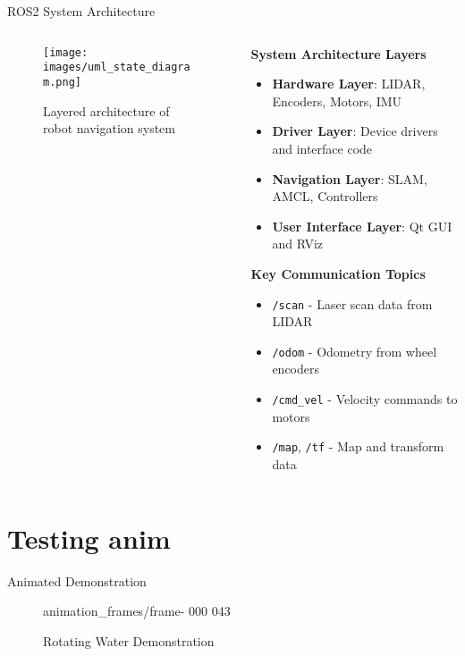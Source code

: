 \documentclass[aspectratio=169]{beamer}
\begin{document}
\begin{frame}{ROS2 System Architecture}
  \begin{columns}
    \begin{column}{0.5\textwidth}
      \begin{figure}
        \centering
        \texttt{[image: images/uml\_state\_diagram.png]} %
        \caption{Layered architecture of robot navigation system}
      \end{figure}
    \end{column}
    \begin{column}{0.5\textwidth}
      \textbf{System Architecture Layers}
      \begin{itemize}
      \item \textbf{Hardware Layer}: LIDAR, Encoders, Motors, IMU
      \item \textbf{Driver Layer}: Device drivers and interface code
      \item \textbf{Navigation Layer}: SLAM, AMCL, Controllers
      \item \textbf{User Interface Layer}: Qt GUI and RViz
      \end{itemize}
      \vspace{0.5cm}
      \textbf{Key Communication Topics}
      \begin{itemize}
      \item \texttt{/scan} - Laser scan data from LIDAR
      \item \texttt{/odom} - Odometry from wheel encoders
      \item \texttt{/cmd\_vel} - Velocity commands to motors
      \item \texttt{/map}, \texttt{/tf} - Map and transform data
      \end{itemize}
    \end{column}
  \end{columns}
\end{frame}

\section{Testing anim}

\begin{frame}{Animated Demonstration}
  \begin{figure}
    \centering
                    {animation_frames/frame-}  %
                    {000}                %
                    {043}               %
                    \caption{Rotating Water Demonstration}
  \end{figure}
\end{frame}
\end{document}
